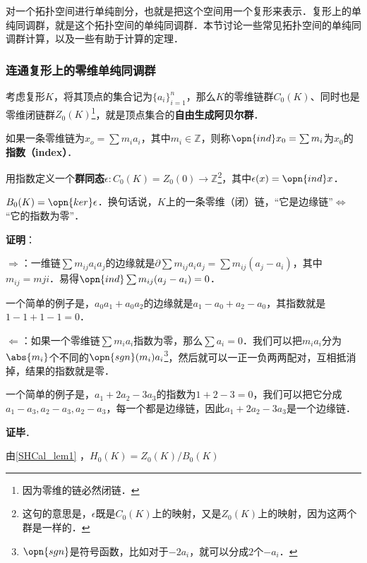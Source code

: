 

对一个拓扑空间进行单纯剖分，也就是把这个空间用一个复形来表示．复形上的单纯同调群，就是这个拓扑空间的单纯同调群．本节讨论一些常见拓扑空间的单纯同调群计算，以及一些有助于计算的定理．

\subsubsection{连通复形上的零维单纯同调群}

考虑复形$K$，将其顶点的集合记为$\{a_i\}_{i=1}^n$，那么$K$的零维链群$C_0(K)$、同时也是零维闭链群$Z_0(K)$\footnote{因为零维的链必然闭链．}，就是顶点集合的\textbf{自由生成阿贝尔群}．

如果一条零维链为$x_o=\sum m_ia_i$，其中$m_i\in\mathbb{Z}$，则称$\opn{ind} x_0=\sum m_i$为$x_0$的\textbf{指数（index）}．

用指数定义一个\textbf{群同态}$\epsilon: C_0(K)=Z_0(0)\to\mathbb{Z}$\footnote{这句的意思是，$\epsilon$既是$C_0(K)$上的映射，又是$Z_0(K)$上的映射，因为这两个群是一样的．}，其中$\epsilon(x)=\opn{ind} x$．

\begin{lemma}{}\label{SHCal_lem1}
$B_0(K)=\opn{ker}\epsilon$．换句话说，$K$上的一条零维（闭）链，“它是边缘链”$\iff$“它的指数为零”．
\end{lemma}

\textbf{证明}：

$\Rightarrow$：一维链$\sum m_{ij}a_ia_j$的边缘就是$\partial\sum m_{ij}a_ia_j=\sum m_{ij}(a_j-a_i)$，其中$m_{ij}=m{ji}$．易得$\opn{ind}\sum m_{ij}(a_j-a_i)=0$．

一个简单的例子是，$a_0a_1+a_0a_2$的边缘就是$a_1-a_0+a_2-a_0$，其指数就是$1-1+1-1=0$．


$\Leftarrow$：如果一个零维链$\sum m_ia_i$指数为零，那么$\sum a_i=0$．我们可以把$m_ia_i$分为$\abs{m_i}$个不同的$\opn{sgn}(m_i)a_i$\footnote{$\opn{sgn}$是符号函数，比如对于$-2a_i$，就可以分成$2$个$-a_i$．}，然后就可以一正一负两两配对，互相抵消掉，结果的指数就是零．

一个简单的例子是，$a_1+2a_2-3a_3$的指数为$1+2-3=0$，我们可以把它分成$a_1-a_3, a_2-a_3, a_2-a_3$，每一个都是边缘链，因此$a_1+2a_2-3a_3$是一个边缘链．

\textbf{证毕}．

由\autoref{SHCal_lem1} ，$H_0(K)=Z_0(K)/B_0(K)$














